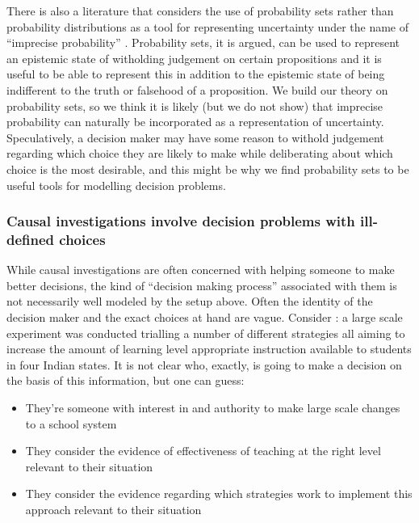 There is also a literature that considers the use of probability sets rather than probability distributions as a tool for representing uncertainty under the name of ``imprecise probability'' \citet{bradley_imprecise_2019,walley_statistical_1991}. Probability sets, it is argued, can be used to represent an epistemic state of witholding judgement on certain propositions and it is useful to be able to represent this in addition to the epistemic state of being indifferent to the truth or falsehood of a proposition. We build our theory on probability sets, so we think it is likely (but we do not show) that imprecise probability can naturally be incorporated as a representation of uncertainty. Speculatively, a decision maker may have some reason to withold judgement regarding which choice they are likely to make while deliberating about which choice is the most desirable, and this might be why we find probability sets to be useful tools for modelling decision problems.

\subsubsection{Causal investigations involve decision problems with ill-defined choices}

While causal investigations are often concerned with helping someone to make better decisions, the kind of ``decision making process'' associated with them is not necessarily well modeled by the setup above. Often the identity of the decision maker and the exact choices at hand are vague. Consider \citet{banerjee_mainstreaming_2016}: a large scale experiment was conducted trialling a number of different strategies all aiming to increase the amount of learning level appropriate instruction available to students in four Indian states. It is not clear who, exactly, is going to make a decision on the basis of this information, but one can guess:

\begin{itemize}
    \item They're someone with interest in and authority to make large scale changes to a school system
    \item They consider the evidence of effectiveness of teaching at the right level relevant to their situation
    \item They consider the evidence regarding which strategies work to implement this approach relevant to their situation
\end{itemize}

